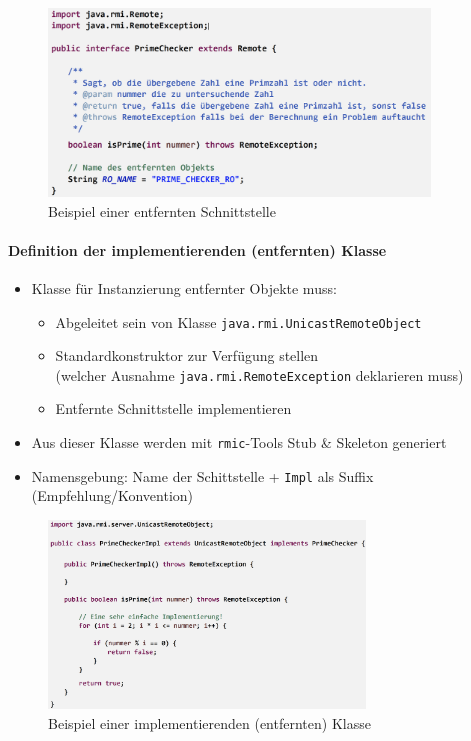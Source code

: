 \documentclass[a4paper]{article}
\begin{document}
					\begin{figure}[!htb]
						\centering
						\includegraphics[keepaspectratio, height=5cm]{img/rmi/remote_int.png}
						\caption{Beispiel einer entfernten Schnittstelle}
						\label{fig:remote_int}
					\end{figure}
				
				\paragraph{Definition der implementierenden (entfernten) Klasse}
				
					\begin{itemize}
						\item Klasse für Instanzierung entfernter Objekte muss:
							\begin{itemize}
								\item Abgeleitet sein von Klasse \texttt{java.rmi.UnicastRemoteObject}
								\item Standardkonstruktor zur Verfügung stellen\\
								(welcher Ausnahme \texttt{java.rmi.RemoteException} deklarieren muss)
								\item Entfernte Schnittstelle implementieren
							\end{itemize}
						\item Aus dieser Klasse werden mit \texttt{rmic}-Tools Stub \& Skeleton generiert
						\item Namensgebung: Name der Schittstelle + \texttt{Impl} als Suffix (Empfehlung/Konvention)
					\end{itemize}
				
					\begin{figure}[!htb]
						\centering
						\includegraphics[keepaspectratio, height=5cm]{img/rmi/rmi_impl.png}
						\caption{Beispiel einer implementierenden (entfernten) Klasse}
						\label{fig:rmi_impl}
					\end{figure}
		
\end{document}
